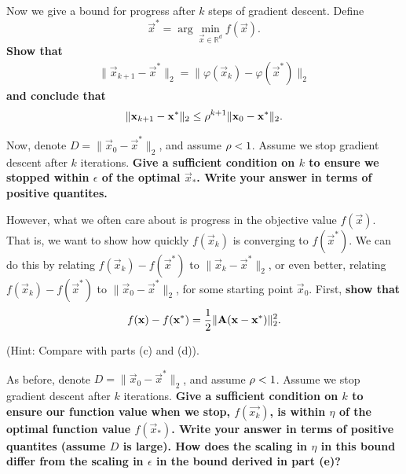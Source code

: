 \documentclass[11pt]{article}
\begin{document}
\begin{Parts}
\Part \label{pt:x-bound} Now we give a bound for progress after $k$ steps of gradient descent. Define
$$\vec{x}^* = \arg \min_{\vec{x} \in \mathbb{R}^d} f(\vec{x}).$$
\textbf{Show that }
\begin{align*}
\| \vec{x}_{k+1} - \vec{x}^* \|_2 = \| \varphi(\vec{x}_k) - \varphi(\vec{x}^*) \|_2
\end{align*}
\textbf{ and conclude that}
\begin{align*}
\| \boldsymbol{\mathbf{x}}_{k+1} - \boldsymbol{\mathbf{x}}^* \|_2 \leq \rho^{k+1} \|\boldsymbol{\mathbf{x}}_0 - \boldsymbol{\mathbf{x}}^*\|_2.
\end{align*}



\Part Now, denote $D = \|\vec{x}_0 - \vec{x}^*\|_2$, and assume $\rho<1$. Assume we stop gradient descent after $k$ iterations. {\bf{Give a sufficient condition on $k$ to ensure we stopped within $\epsilon$ of the optimal $\vec{x}_*$. Write your answer in terms of positive quantites.}}

 

\Part  However, what we often care about is progress in the
objective value $f(\vec{x})$. That is, we want to show how quickly $f(\vec{x}_k)$
is converging to $f(\vec{x}^*)$. We can do this by relating $f(\vec{x}_k)-f(\vec{x}^*)$ to
$\|\vec{x}_k-\vec{x}^*\|_2$, or even better,
relating $f(\vec{x}_k)-f(\vec{x}^*)$ to $\|\vec{x}_0-\vec{x}^*\|_2$,
for some starting point $\vec{x}_0$. First, \textbf{show that}
\begin{align*}
f(\boldsymbol{\mathbf{x}}) - f(\boldsymbol{\mathbf{x}}^*) = \frac{1}{2}\|\mathbf{A} (\boldsymbol{\mathbf{x}}-\boldsymbol{\mathbf{x}}^*)\|_2^2.
\end{align*}



(Hint: Compare with parts (c) and (d)).




\Part As before, denote $D = \|\vec{x}_0 - \vec{x}^*\|_2$, and assume $\rho<1$. Assume we stop gradient descent after $k$ iterations. {\bf{Give a sufficient condition on $k$ to ensure our function value when we stop, $f(\vec{x_k})$, is within $\eta$ of the optimal function value $f(\vec{x}_*)$. Write your answer in terms of positive quantites (assume $D$ is large). How does the scaling in $\eta$ in this bound differ from the scaling in $\epsilon$ in the bound derived in part (e)?}}


\end{Parts}
\end{document}
